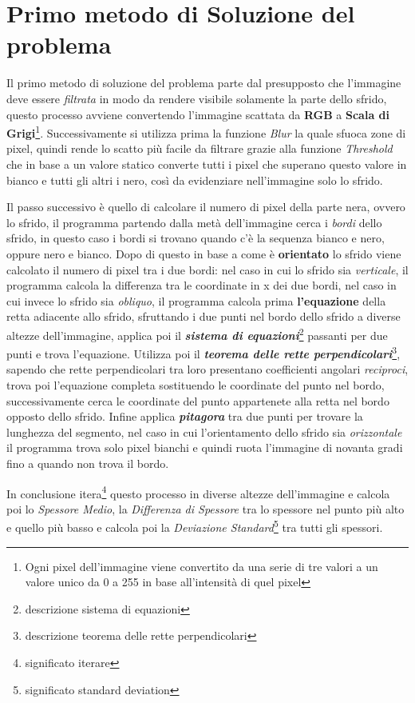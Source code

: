 \documentclass[a4paper, notitlepage, 12pt]{article}
\begin{document}
    \section{Primo metodo di Soluzione del problema}
    \noindent Il primo metodo di soluzione del problema parte dal presupposto che l'immagine deve essere \emph{filtrata} in modo
    da rendere visibile solamente la parte dello sfrido, questo processo avviene convertendo l'immagine scattata da \textbf{RGB} a 
    \textbf{Scala di Grigi}\footnote[4]{\indent Ogni pixel dell'immagine viene convertito da una serie di tre valori a un valore unico da 0 a 255 in base all'intensità di quel pixel}.
    Successivamente si utilizza prima la funzione \emph{Blur} la quale sfuoca zone di pixel, quindi rende lo scatto più facile da filtrare 
    grazie alla funzione \emph{Threshold} che in base a un valore statico converte tutti i pixel che superano questo valore in bianco e tutti gli altri i nero,
    così da evidenziare nell'immagine solo lo sfrido.\par
    \noindent Il passo successivo è quello di calcolare il numero di pixel della parte nera, ovvero lo sfrido, il programma partendo 
    dalla metà dell'immagine cerca i \emph{bordi} dello sfrido, in questo caso i bordi si trovano quando c'è la sequenza bianco e nero, oppure
    nero e bianco. Dopo di questo in base a come è \textbf{orientato} lo sfrido viene calcolato il numero di pixel tra i due bordi: nel caso
    in cui lo sfrido sia \emph{verticale}, il programma calcola la differenza tra le coordinate in x dei due bordi, nel caso in cui invece 
    lo sfrido sia \emph{obliquo}, il programma calcola prima \textbf{l'equazione} della retta adiacente allo sfrido, sfruttando i due punti nel bordo dello sfrido
    a diverse altezze dell'immagine, applica poi il \emph{\textbf{sistema di equazioni}}\footnote[5]{\indent descrizione sistema di equazioni} passanti per due punti e trova l'equazione. Utilizza poi 
    il \emph{\textbf{teorema delle rette perpendicolari}}\footnote[6]{\indent descrizione teorema delle rette perpendicolari}, sapendo che rette perpendicolari tra loro presentano coefficienti angolari \emph{reciproci},
    trova poi l'equazione completa sostituendo le coordinate del punto nel bordo, successivamente cerca le coordinate del punto appartenete alla 
    retta nel bordo opposto dello sfrido. Infine applica \emph{\textbf{pitagora}} tra due punti per trovare la lunghezza del segmento, nel caso in cui l'orientamento
    dello sfrido sia \emph{orizzontale} il programma trova solo pixel bianchi e quindi ruota l'immagine di novanta gradi fino a quando
    non trova il bordo.\par
    \noindent In conclusione itera\footnote[7]{\indent significato iterare} questo processo in diverse altezze dell'immagine e calcola poi lo \emph{Spessore Medio}, la \emph{Differenza di Spessore} tra 
    lo spessore nel punto più alto e quello più basso e calcola poi la \emph{Deviazione Standard}\footnote[8]{\indent significato standard deviation} tra tutti gli spessori.
\end{document}
